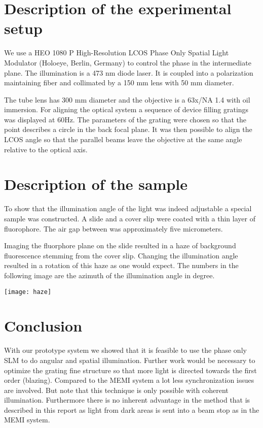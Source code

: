 \section{Description of the experimental setup}
We use a HEO 1080 P High-Resolution LCOS Phase Only Spatial Light
Modulator (Holoeye, Berlin, Germany) to control the phase in the
intermediate plane. The illumination is a 473 nm diode laser. It is
coupled into a polarization maintaining fiber and collimated by a 150
mm lens with 50 mm diameter.

The tube lens has 300 mm diameter and the objective is a 63x/NA 1.4
with oil immersion.  For aligning the optical system a sequence of
device filling gratings was displayed at 60Hz. The parameters of the
grating were chosen so that the point describes a circle in the back
focal plane. It was then possible to align the LCOS angle so that the
parallel beams leave the objective at the same angle relative to the
optical axis.

\section{Description of the sample}
To show that the illumination angle of the light was indeed adjustable
a special sample was constructed. A slide and a cover slip were coated
with a thin layer of fluorophore. The air gap between was
approximately five micrometers.

Imaging the fluorphore plane on the slide resulted in a haze of
background fluorescence stemming from the cover slip. Changing the
illumination angle resulted in a rotation of this haze as one would
expect. The numbers in the following image are the azimuth of the
illumination angle in degree.

\texttt{[image: haze]}

\section{Conclusion}
With our prototype system we showed that it is feasible to use the
phase only SLM to do angular and spatial illumination. Further work
would be necessary to optimize the grating fine structure so that more
light is directed towards the first order (blazing). Compared to the
MEMI system a lot less synchronization issues are involved. But note
that this technique is only possible with coherent
illumination. Furthermore there is no inherent advantage in the method
that is described in this report as light from dark areas is sent into
a beam stop as in the MEMI system.

